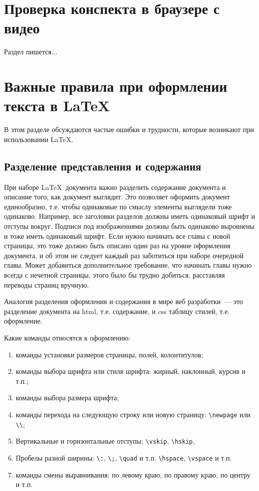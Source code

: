\documentclass{article}
\begin{document}
    \section{Проверка конспекта в браузере с видео}
    Раздел пишется...


    \section{Важные правила при оформлении текста в LaTeX}

    В этом разделе обсуждаются частые ошибки и трудности, которые возникают при
    использовании \LaTeX.

    \subsection{Разделение представления и содержания}

    При наборе \LaTeX\ документа важно разделить содержание документа и описание того,
    как документ выглядит.
    Это позволяет оформить документ единообразно, т.е. чтобы одинаковые по смыслу элементы
    выглядели тоже одинаково. Например, все заголовки разделов должны иметь одинаковый шрифт
    и отступы вокруг. Подписи под изображениями должны быть одинаково выровнены и тоже иметь
    одинаковый шрифт. Если нужно начинать все главы с новой страницы,
    это тоже должно быть описано один раз на уровне оформления документа, и об
    этом не следует каждый раз заботиться при наборе очередной главы. Может добавиться
    дополнительное требование, что начинать главы нужно всегда с нечетной страницы, этого
    было бы трудно добиться, расставляя переводы страниц вручную.

    Аналогия разделения оформления и содержания в мире веб разработки~--- это разделение
    документа на html, т.е. содержание, и css таблицу стилей, т.е. оформление.

    Какие команды относятся к оформлению:
    \begin{enumerate}
        \item команды установки размеров страницы, полей, колонтитулов;
        \item команды выбора шрифта или стиля шрифта: жирный, наклонный, курсив и т.п.;
        \item команды выбора размера шрифта;
        \item команды перехода на следующую строку или новую страницу: \verb|\newpage|
        или \verb|\\|;
        \item Вертикальные и горизонтальные отступы: \verb|\vskip|, \verb|\hskip|,
        \item Пробелы разной ширины: \verb*|\:|, \verb*|\;|, \verb|\quad| и т.п.
        \verb|\hspace|, \verb|\vspace| и т.п.
        \item команды смены выравнивания: по левому краю, по правому краю, по центру и т.п.
    \end{enumerate}
\end{document}

